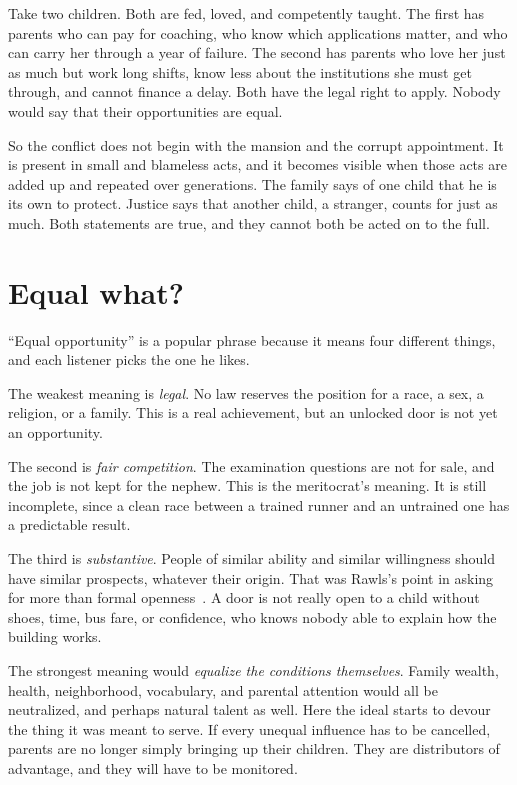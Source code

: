 \documentclass[12pt,a4paper]{book}
\begin{document}
Take two children. Both are fed, loved, and competently taught. The first has parents who can pay for coaching, who know which applications matter, and who can carry her through a year of failure. The second has parents who love her just as much but work long shifts, know less about the institutions she must get through, and cannot finance a delay. Both have the legal right to apply. Nobody would say that their opportunities are equal.

So the conflict does not begin with the mansion and the corrupt appointment. It is present in small and blameless acts, and it becomes visible when those acts are added up and repeated over generations. The family says of one child that he is its own to protect. Justice says that another child, a stranger, counts for just as much. Both statements are true, and they cannot both be acted on to the full.

\section{Equal what?}

``Equal opportunity'' is a popular phrase because it means four different things, and each listener picks the one he likes.

The weakest meaning is \emph{legal}. No law reserves the position for a race, a sex, a religion, or a family. This is a real achievement, but an unlocked door is not yet an opportunity.

The second is \emph{fair competition}. The examination questions are not for sale, and the job is not kept for the nephew. This is the meritocrat's meaning. It is still incomplete, since a clean race between a trained runner and an untrained one has a predictable result.

The third is \emph{substantive}. People of similar ability and similar willingness should have similar prospects, whatever their origin. That was Rawls's point in asking for more than formal openness~\cite{Rawls1999}. A door is not really open to a child without shoes, time, bus fare, or confidence, who knows nobody able to explain how the building works.

The strongest meaning would \emph{equalize the conditions themselves}. Family wealth, health, neighborhood, vocabulary, and parental attention would all be neutralized, and perhaps natural talent as well. Here the ideal starts to devour the thing it was meant to serve. If every unequal influence has to be cancelled, parents are no longer simply bringing up their children. They are distributors of advantage, and they will have to be monitored.
\end{document}
